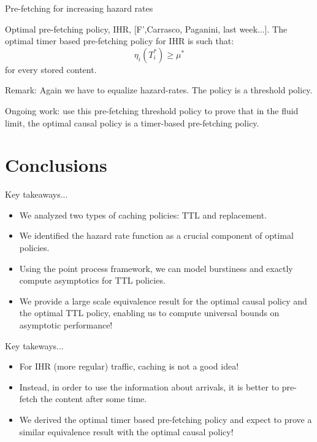 \documentclass[aspectratio=169]{beamer}
\newenvironment*{myitem}[1][1.5em]{\begin{itemize}\setlength{\itemsep}{#1}}{\end{itemize}}
\begin{document}
\begin{frame}{Pre-fetching for increasing hazard rates}

	\begin{block}{Optimal pre-fetching policy, IHR, [F',Carrasco, Paganini, last week...].}
		The optimal timer based pre-fetching policy for IHR is such that:
	   \begin{equation*}
		\eta_i (T_i^*) \geqslant \mu^*
	   \end{equation*}
	  for every stored content.
	   \end{block}
	  \vfill
	
	
	  \alert{Remark:} Again we have to equalize hazard-rates. The policy is a threshold policy.

	  \vfill

	  \alert{Ongoing work:} use this pre-fetching threshold policy to prove that in the fluid limit, the optimal causal policy is a timer-based pre-fetching policy.
	\end{frame}

	
\section{Conclusions}

\begin{frame}{Key takeaways...}
	
	\begin{myitem}[2em]
		\item We analyzed two types of caching policies: TTL and replacement.
		\item We identified the \alert{hazard rate} function as a crucial component of optimal policies.
		\item Using the point process framework, we can model burstiness and exactly compute asymptotics for TTL policies.
		\item We provide a large scale equivalence result for the optimal causal policy and the optimal TTL policy, enabling us to compute universal bounds on asymptotic performance!
	\end{myitem}
\end{frame}

\begin{frame}{Key takeways...}
	
	\begin{myitem}[2em]
		\item For IHR (more regular) traffic, caching is not a good idea!
		\item Instead, in order to use the information about arrivals, it is better to \alert{pre-fetch} the content after some time.
		\item We derived the optimal timer based pre-fetching policy and expect to prove a similar equivalence result with the optimal causal policy!
	\end{myitem}

\end{frame}
\end{document}
